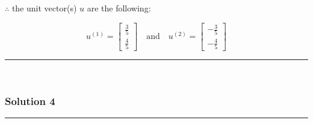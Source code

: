 \documentclass{article}
\begin{document}
\subsubsection*{\normalfont}{$\therefore$ the unit vector(s) $u$ are the following:}

$$u^{(1)} = \begin{bmatrix}\frac{3}{5} \\[4pt] \frac{4}{5}\end{bmatrix}
\quad \text{and} \quad
u^{(2)} = \begin{bmatrix}-\frac{3}{5} \\[4pt] -\frac{4}{5}\end{bmatrix}$$

\noindent\rule{\textwidth}{0.4pt}\\

\newpage

\subsubsection*{Solution 4}
\noindent\rule{\textwidth}{0.4pt}\\
\end{document}
